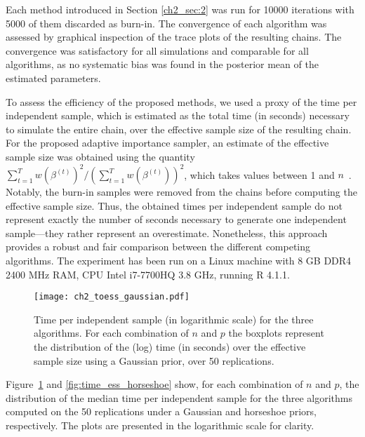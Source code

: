 Each method introduced in Section \ref{ch2_sec:2}  was run for 10000 iterations with  5000 of them discarded as burn-in. The convergence of each algorithm was assessed by graphical inspection of the trace plots of the resulting chains. The convergence was satisfactory for all simulations and comparable for all algorithms, as no systematic bias was found in the posterior mean of the estimated parameters. 



To assess the efficiency of the proposed methods, we used a proxy of the time per independent sample, which is estimated as the total time (in seconds) necessary to simulate the entire chain, over the effective sample size of the resulting chain. For the proposed adaptive importance sampler, an estimate of the effective sample size was obtained using the quantity $\sum_{t=1}^T w(\beta^{(t)})^2 / (\sum_{t=1}^T w(\beta^{(t)}))^2$, which takes values between 1 and $n$~\parencite{robert2010}. 
Notably, the burn-in samples were removed from the chains before computing the effective sample size. Thus, the obtained times per independent sample  do not represent exactly the number of seconds necessary to generate one independent sample---they rather represent an overestimate. Nonetheless, this approach provides a robust and fair comparison between the different competing algorithms. The experiment has been run on a Linux machine with 8 GB DDR4 2400 MHz RAM, CPU Intel i7-7700HQ 3.8 GHz, running R 4.1.1.
%
\begin{figure}[h]
	\begin{center}
		\texttt{[image: ch2\_toess\_gaussian.pdf]}
		\caption[Comparison between the time per independent sample of the proposed algorithms and of the HMC algorithm.]{Time per independent sample (in logarithmic scale) for the three algorithms. For each combination of $n$ and $p$ the boxplots represent the distribution of the (log) time (in seconds) over the effective sample size using a Gaussian prior, over 50 replications.
		\label{fig:time_ess}}
	\end{center}
\end{figure}

Figure~\ref{fig:time_ess} and \ref{fig:time_ess_horseshoe} show, for each combination of $n$ and $p$, the distribution of the median time per independent sample for the three algorithms computed on the 50 replications under a Gaussian and horseshoe priors, respectively. The plots are presented in the logarithmic scale for clarity. 

